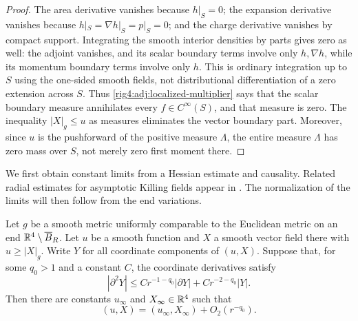 \begin{proof}
The area derivative vanishes because $h|_S=0$; the expansion derivative
vanishes because $h|_S=\nabla h|_S=p|_S=0$; and the charge derivative
vanishes by compact support.  Integrating the smooth interior densities by
parts gives zero as well: the adjoint vanishes, and its scalar boundary
terms involve only $h,\nabla h$, while its momentum boundary terms involve
only $h$.  This is ordinary integration up to $S$ using the one-sided smooth
fields, not distributional differentiation of a zero extension across $S$.
Thus \eqref{rig4:adj:localized-multiplier} says that the scalar boundary measure
annihilates every $f\in C^\infty(S)$, and that measure is zero.
The inequality $|X|_g\le u$ as measures eliminates the vector boundary part.
Moreover, since $u$ is the pushforward of the positive measure $\Lambda$,
the entire measure $\Lambda$ has zero mass over $S$, not merely zero first
moment there.
\end{proof}

We first obtain constant limits from a Hessian estimate and causality.
Related radial estimates for asymptotic Killing fields appear in
\cite[Proposition~2.1 and Appendix~C]{BeigChrusciel1996}.
The normalization of the limits will then follow from the end variations.

\begin{lemma}
\label{rig4:adj:causal-jet-asymptotics}
Let $g$ be a smooth metric uniformly comparable to the Euclidean metric
on an end $\mathbb R^4\setminus\overline B_R$. Let $u$ be a smooth function
and $X$ a smooth vector field there with $u\ge |X|_g$. Write $Y$ for
all coordinate components of $(u,X)$. Suppose that, for some $q_0>1$
and a constant $C$, the coordinate derivatives satisfy
\begin{equation}
 |\partial^2Y|
 \le C r^{-1-q_0}|\partial Y|+C r^{-2-q_0}|Y|.
 \label{rig4:adj:jet-estimate}
\end{equation}
Then there are constants $u_\infty$ and $X_\infty\in\mathbb R^4$ such that
\[
 (u,X)=(u_\infty,X_\infty)+O_2(r^{-q_0}).
\]
\end{lemma}

